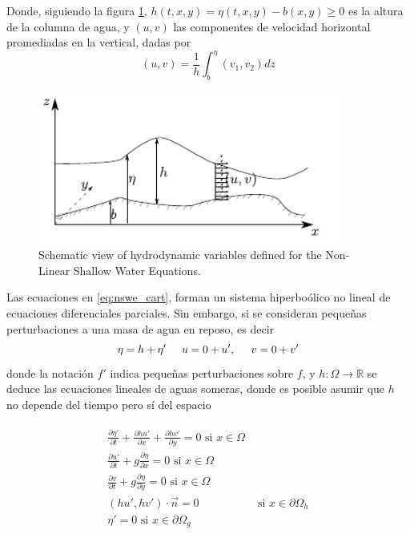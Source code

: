  Donde, siguiendo la figura \ref{fig:vars}, $h(t,x,y)=\eta(t,x,y)-b(x,y) \geq 0$ es la altura de la columna de agua,  y $(u,v)$ las componentes de velocidad horizontal promediadas en la vertical, dadas por
 $$
  (u,v)=\frac{1}{h}\int_{b}^\eta (v_1,v_2)dz
 $$
  
  \begin{figure}
    \centering
    \includegraphics[width=10cm]{figs/variables.pdf}    
    \caption{Schematic view of hydrodynamic variables defined for the Non-Linear Shallow Water Equations.}
    \label{fig:vars}
  \end{figure}

Las ecuaciones en \eqref{eq:nswe_cart}, forman un sistema hiperbo\'olico no lineal de ecuaciones diferenciales parciales. Sin embargo, si se consideran peque\~nas perturbaciones a una masa de agua en reposo, es decir
$$
	\eta=h+\eta' \hspace{.5cm} u=0+u',\hspace{.5cm} v = 0 + v'
$$
donde la notaci\'on $f'$ indica peque\~nas perturbaciones sobre $f$, y $h:\Omega\rightarrow \mathbb{R}$ se deduce las ecuaciones lineales de aguas someras, donde es posible asumir que $h$ no depende del tiempo pero s\'i del espacio

\begin{align}
	\begin{split}
	\frac{\partial \eta'}{\partial t}+\frac{\partial hu'}{\partial x}+\frac{\partial hv'}{\partial y} = 0  \text{ si } x \in \Omega\\
    \frac{\partial u'}{\partial t} + g\frac{\partial \eta}{\partial x}=0  \text{ si } x \in \Omega\\
    \frac{\partial v}{\partial t} + g\frac{\partial \eta}{\partial y} = 0  \text{ si } x \in \Omega \\
    (hu',hv') \cdot \vec n = 0 & \text{ si } x\in\partial \Omega_h \\
   \eta' = 0  \text{ si } x \in \partial \Omega_g  
    \end{split}
    \label{swe}
\end{align}

